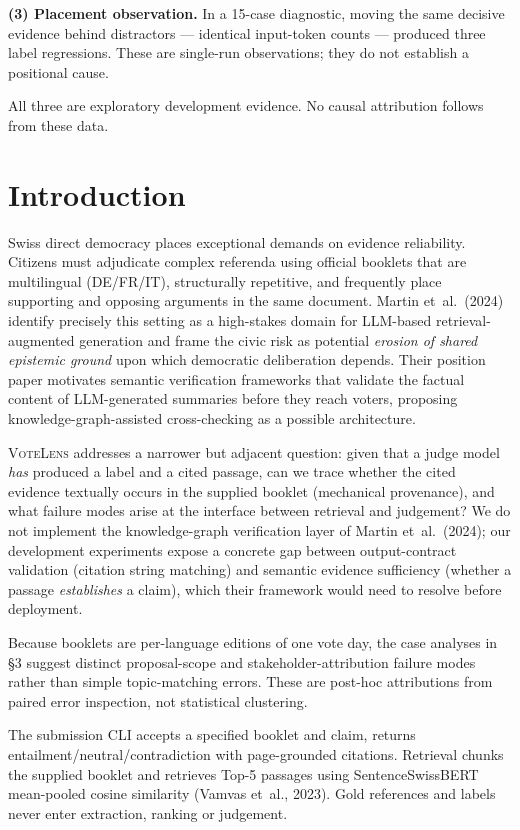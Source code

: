 \documentclass[10pt,a4paper]{article}
\newcommand{\votelens}{\textsc{VoteLens}}
\begin{document}
\textbf{(3) Placement observation.} In a 15-case diagnostic, moving the same decisive evidence behind distractors --- identical input-token counts --- produced three label regressions. These are single-run observations; they do not establish a positional cause.

All three are exploratory development evidence. No causal attribution follows from these data.

\section{Introduction}

Swiss direct democracy places exceptional demands on evidence reliability. Citizens must adjudicate complex referenda using official booklets that are multilingual (DE/FR/IT), structurally repetitive, and frequently place supporting and opposing arguments in the same document. Martin et~al.~(2024) identify precisely this setting as a high-stakes domain for LLM-based retrieval-augmented generation and frame the civic risk as potential \emph{erosion of shared epistemic ground} upon which democratic deliberation depends. Their position paper motivates semantic verification frameworks that validate the factual content of LLM-generated summaries before they reach voters, proposing knowledge-graph-assisted cross-checking as a possible architecture.

\votelens{} addresses a narrower but adjacent question: given that a judge model \emph{has} produced a label and a cited passage, can we trace whether the cited evidence textually occurs in the supplied booklet (mechanical provenance), and what failure modes arise at the interface between retrieval and judgement? We do not implement the knowledge-graph verification layer of Martin et~al.~(2024); our development experiments expose a concrete gap between output-contract validation (citation string matching) and semantic evidence sufficiency (whether a passage \emph{establishes} a claim), which their framework would need to resolve before deployment.

Because booklets are per-language editions of one vote day, the case analyses in \S3 suggest distinct proposal-scope and stakeholder-attribution failure modes rather than simple topic-matching errors. These are post-hoc attributions from paired error inspection, not statistical clustering.

The submission CLI accepts a specified booklet and claim, returns entailment/neutral/contradiction with page-grounded citations. Retrieval chunks the supplied booklet and retrieves Top-5 passages using SentenceSwissBERT mean-pooled cosine similarity (Vamvas et~al., 2023). Gold references and labels never enter extraction, ranking or judgement.
\end{document}
